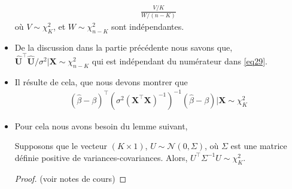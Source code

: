 \begin{frame}[allowframebreaks]
\begin{itemize}
\begin{align*}
\frac{V/K}{W/(n-K)}
\end{align*}
où $V \sim \chi^2_K$, et $W\sim\chi^2_{n-K}$ sont indépendantes. 
\item De la discussion dans la partie précédente nous savons que, $\widehat{\mathbf{U}}^\top\widehat{\mathbf{U}}/\sigma^2|\mathbf{X}\sim\chi^2_{n-K}$ qui est indépendant du numérateur dans \eqref{eq29}.
\item  Il résulte de cela, que nous devons montrer que 
\begin{align}
(\widehat{\beta}-\beta)^\top\left(\sigma^2(\mathbf{X}^\top\mathbf{X})^{-1}
\right)^{-1}
(\widehat{\beta}-\beta) | \mathbf{X}\sim \chi^2_K
\label{eq30}
\end{align}
\item Pour cela nous avons besoin du lemme suivant,
\begin{lemme}
Supposons que le vecteur $(K\times 1)$, $U\sim\mathcal{N}(0, \Sigma)$, où $\Sigma$ est une matrice définie positive de variances-covariances. Alors, $U^\top\Sigma^{-1}U\sim\chi^2_K$.
\label{le2}
\end{lemme}
\begin{proof}
(voir notes de cours)
\end{proof}


\end{itemize}
\end{frame}
